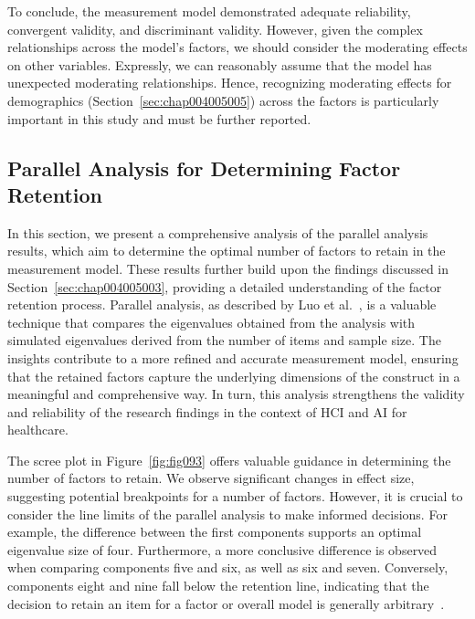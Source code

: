 To conclude, the measurement model demonstrated adequate reliability, convergent validity, and discriminant validity.
However, given the complex relationships across the model's factors, we should consider the moderating effects on other variables.
Expressly, we can reasonably assume that the model has unexpected moderating relationships.
Hence, recognizing moderating effects for demographics (Section~\ref{sec:chap004005005}) across the factors is particularly important in this study and must be further reported.

\subsection{Parallel Analysis for Determining Factor Retention}
\label{chap:app003004003}

In this section, we present a comprehensive analysis of the parallel analysis results, which aim to determine the optimal number of factors to retain in the measurement model.
These results further build upon the findings discussed in Section~\ref{sec:chap004005003}, providing a detailed understanding of the factor retention process.
Parallel analysis, as described by Luo et al.~\cite{doi:10.1080/10705511.2019.1615835}, is a valuable technique that compares the eigenvalues obtained from the analysis with simulated eigenvalues derived from the number of items and sample size.
The insights contribute to a more refined and accurate measurement model, ensuring that the retained factors capture the underlying dimensions of the construct in a meaningful and comprehensive way.
In turn, this analysis strengthens the validity and reliability of the research findings in the context of \ac{HCI} and \ac{AI} for healthcare.

The scree plot in Figure~\ref{fig:fig093} offers valuable guidance in determining the number of factors to retain.
We observe significant changes in effect size, suggesting potential breakpoints for a number of factors.
However, it is crucial to consider the line limits of the parallel analysis to make informed decisions.
For example, the difference between the first components supports an optimal eigenvalue size of four.
Furthermore, a more conclusive difference is observed when comparing components five and six, as well as six and seven.
Conversely, components eight and nine fall below the retention line, indicating that the decision to retain an item for a factor or overall model is generally arbitrary~\cite{doi:10.1207/S15328031US0201}.

